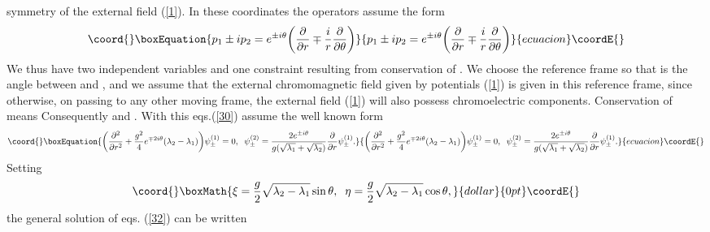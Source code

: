 \documentclass[a4paper,12pt,a4]{article}
\begin{document}
symmetry of the external field (\ref{1}).
In these coordinates the operators \coordHE{}
assume the form
\begin{equation}\coord{}\boxEquation{
p_1\pm ip_2 = e^{\pm i\theta}\bigg(\frac{\partial}{\partial r}\mp\frac{i}
{r}\frac{\partial}{\partial\theta}\bigg)
\label{31}
}{
p_1\pm ip_2 = e^{\pm i\theta}\bigg(\frac{\partial}{\partial r}\mp\frac{i}
{r}\frac{\partial}{\partial\theta}\bigg)
}{ecuacion}\coordE{}\end{equation}
We thus have two independent variables \coordHE{}
and one constraint resulting from conservation of
\coordHE{}. 
We choose the reference frame so that \myHighlight{$\theta$}\coordHE{} is the
angle between \myHighlight{${\bf \sigma} $}\coordHE{} and \coordHE{}, and
we assume that the external chromomagnetic field given
by potentials (\ref{1}) is given in this
reference frame, since otherwise, 
on passing to any other moving frame, the external
field (\ref{1}) will also possess chromoelectric
components.  Conservation of \coordHE{}
means \coordHE{} Consequently
\coordHE{} and \coordHE{}.
With this eqs.(\ref{30}) assume the well known form
\begin{equation}\coord{}\boxEquation{
\bigg(\frac{\partial^2}{\partial r^2}+\frac{g^2}{4}e^{\mp2i\theta}
(\lambda_2-\lambda_1)\bigg)\psi^{(1)}_{\pm} =0, \;\;
\psi^{(2)}_{\pm}=\frac{2e^{\pm i\theta}}{g(\sqrt{\lambda_1}+\sqrt{\lambda_2})}
\frac{\partial}{\partial r}\psi^{(1)}_{\pm}.
\label{32}
}{
\bigg(\frac{\partial^2}{\partial r^2}+\frac{g^2}{4}e^{\mp2i\theta}
(\lambda_2-\lambda_1)\bigg)\psi^{(1)}_{\pm} =0, \;\;
\psi^{(2)}_{\pm}=\frac{2e^{\pm i\theta}}{g(\sqrt{\lambda_1}+\sqrt{\lambda_2})}
\frac{\partial}{\partial r}\psi^{(1)}_{\pm}.
}{ecuacion}\coordE{}\end{equation}
Setting
$$\coord{}\boxMath{
\xi=\frac{g}{2}\sqrt{\lambda_2-\lambda_1}\sin\theta, \;\;
\eta=\frac{g}{2}\sqrt{\lambda_2-\lambda_1}\cos\theta,
}{dollar}{0pt}\coordE{}$$
the general solution of eqs. (\ref{32}) can be written
\end{document}
